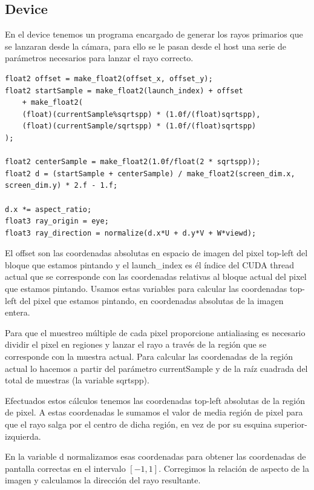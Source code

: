\clearpage

\subsection{Device}

En el device tenemos un programa encargado de generar los rayos primarios que se lanzaran desde la cámara, para ello se le pasan desde el host una serie de parámetros necesarios para lanzar el rayo correcto.

\begin{lstlisting}
float2 offset = make_float2(offset_x, offset_y);
float2 startSample = make_float2(launch_index) + offset 
	+ make_float2(
	(float)(currentSample%sqrtspp) * (1.0f/(float)sqrtspp),
	(float)(currentSample/sqrtspp) * (1.0f/(float)sqrtspp)
);

float2 centerSample = make_float2(1.0f/float(2 * sqrtspp));
float2 d = (startSample + centerSample) / make_float2(screen_dim.x, screen_dim.y) * 2.f - 1.f;

d.x *= aspect_ratio;
float3 ray_origin = eye;
float3 ray_direction = normalize(d.x*U + d.y*V + W*viewd);
\end{lstlisting}

El offset son las coordenadas absolutas en espacio de imagen del pixel top-left del bloque que estamos pintando y el launch\_index es él índice del CUDA thread actual que se corresponde con las coordenadas relativas al bloque actual del pixel que estamos pintando. Usamos estas variables para calcular las coordenadas top-left del pixel que estamos pintando, en coordenadas absolutas de la imagen entera.

\medskip

Para que el muestreo múltiple de cada pixel proporcione antialiasing es necesario dividir el pixel en regiones y lanzar el rayo a través de la región que se corresponde con la muestra actual. Para calcular las coordenadas de la región actual lo hacemos a partir del parámetro currentSample y de la raíz cuadrada del total de muestras (la variable sqrtspp).

\medskip

Efectuados estos cálculos tenemos las coordenadas top-left absolutas de la región de pixel. A estas coordenadas le sumamos el valor de media región de pixel para que el rayo salga por el centro de dicha región, en vez de por su esquina superior-izquierda.

\medskip

En la variable d normalizamos esas coordenadas para obtener las coordenadas de pantalla correctas en el intervalo $[-1, 1]$. Corregimos la relación de aspecto de la imagen y calculamos la dirección del rayo resultante.

